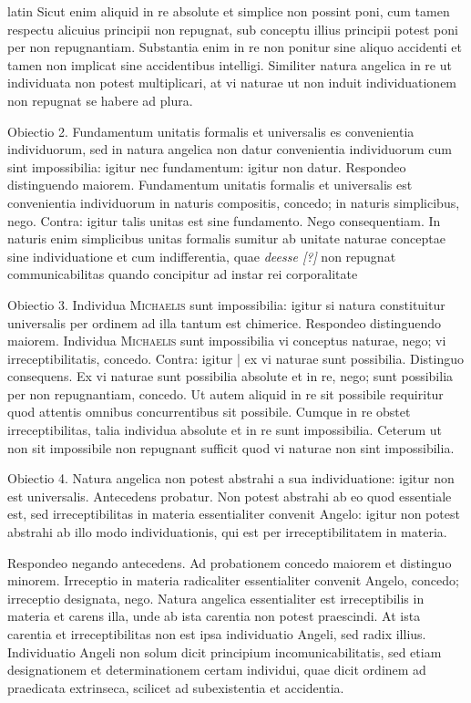 \begin{otherlanguage*}{latin}
\pstart
 Sicut enim aliquid in re absolute et simplice non possint poni, cum tamen respectu alicuius principii non repugnat, sub conceptu illius principii potest poni per non repugnantiam. Substantia enim in re non ponitur sine aliquo accidenti et tamen non implicat sine accidentibus intelligi. Similiter natura angelica in re ut individuata non potest multiplicari, at vi naturae ut non induit individuationem non repugnat se habere ad plura. 
\pend

\pstart
 Obiectio 2. Fundamentum unitatis formalis et universalis es convenientia individuorum, sed in natura angelica non datur convenientia individuorum cum sint impossibilia: igitur nec fundamentum: igitur non datur. Respondeo distinguendo maiorem. Fundamentum unitatis formalis et universalis est convenientia individuorum in naturis compositis, concedo; in naturis simplicibus, nego. Contra: igitur talis unitas est sine fundamento. Nego consequentiam. In naturis enim simplicibus unitas formalis sumitur ab unitate naturae conceptae sine individuatione et cum indifferentia, quae \emph{deesse [?]} non repugnat communicabilitas quando concipitur ad instar rei corporalitate 
\pend

\pstart
 Obiectio 3. Individua \textsc{Michaelis}\index[persons]{} sunt impossibilia: igitur si natura constituitur universalis per ordinem ad illa tantum est chimerice. Respondeo distinguendo maiorem. Individua \textsc{Michaelis}\index[persons]{} sunt impossibilia vi conceptus naturae, nego; vi irreceptibilitatis, concedo. Contra: igitur \textnormal{|} ex vi naturae sunt possibilia. Distinguo consequens. Ex vi naturae sunt possibilia absolute et in re, nego; sunt possibilia per  non repugnantiam, concedo. Ut autem aliquid in re sit possibile requiritur quod attentis omnibus concurrentibus sit possibile. Cumque in re obstet irreceptibilitas, talia individua absolute et in re sunt impossibilia. Ceterum ut non sit impossibile non repugnant sufficit quod vi naturae non sint impossibilia. 
\pend

\pstart
 Obiectio 4. Natura angelica non potest abstrahi a sua individuatione: igitur non est universalis. Antecedens probatur. Non potest abstrahi ab eo quod essentiale est, sed irreceptibilitas in materia essentialiter convenit Angelo: igitur non potest abstrahi ab illo modo individuationis, qui est per irreceptibilitatem in materia. 
\pend

\pstart
 Respondeo negando antecedens. Ad probationem concedo maiorem et distinguo minorem. Irreceptio in materia radicaliter essentialiter convenit Angelo, concedo; irreceptio designata, nego. Natura angelica essentialiter est irreceptibilis in materia et carens illa, unde ab ista carentia non potest praescindi. At ista carentia et irreceptibilitas non est ipsa individuatio Angeli, sed radix illius. Individuatio Angeli non solum dicit principium incomunicabilitatis, sed etiam designationem et determinationem certam individui, quae dicit ordinem ad praedicata extrinseca, scilicet ad subexistentia et accidentia. 
\pend


\end{otherlanguage*}
